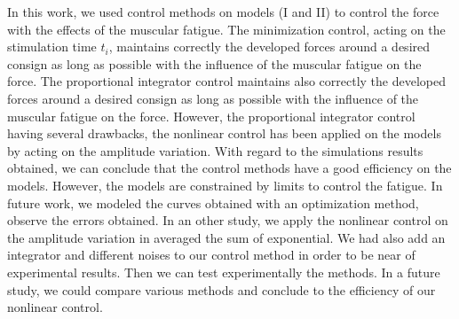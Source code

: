 \documentclass[10pt,twocolumn,letterpaper, 
]{article}
\begin{document}
In this work, we used control methods on models (I and II) to control the force with the effects of the muscular fatigue. The minimization control, acting on the stimulation time $t_i$, maintains correctly the developed forces around a desired consign as long as possible with the influence of the muscular fatigue on the force. The proportional integrator control maintains also correctly the developed forces around a desired consign as long as possible with the influence of the muscular fatigue on the force. However, the proportional integrator control having several drawbacks, the nonlinear control has been applied on the models by acting on the amplitude variation. With regard to the simulations results obtained, we can conclude that the control methods have a good efficiency on the models. However, the models are constrained by limits to control the fatigue. In future work, we modeled the curves obtained with an optimization method, observe the errors obtained. In an other study, we apply the nonlinear control on the amplitude variation in averaged the sum of exponential. We had also add an integrator and different noises to our control method in order to be near of experimental results. Then we can test experimentally the methods. In a future study, we could compare various methods and conclude to the efficiency of our nonlinear control. 
\end{document}
